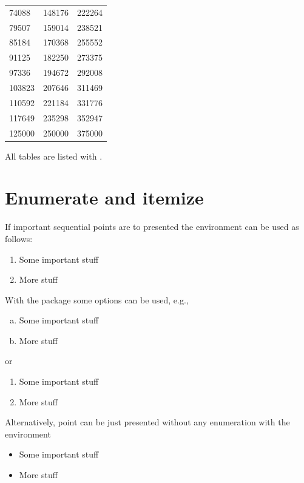 \begin{center}
\begin{longtable}{l|l|l}
 74088 & 148176 & 222264 \\
 79507 & 159014 & 238521 \\
 85184 & 170368 & 255552 \\
 91125 & 182250 & 273375 \\
 97336 & 194672 & 292008 \\
 103823 & 207646 & 311469 \\
 110592 & 221184 & 331776 \\
 117649 & 235298 & 352947 \\
 125000 & 250000 & 375000 \\
\end{longtable}
\end{center}

All tables are listed with .


\section{Enumerate and itemize}

If important sequential points are to presented the environment  can be used as follows:
\begin{enumerate}
\item
	Some important stuff
\item
	More stuff
\end{enumerate}
With the package  some options can be used, e.g.,
\begin{enumerate}[a)]
\item
	Some important stuff
\item
	More stuff
\end{enumerate}
or 
\begin{enumerate}[~~~1)]
\item
	Some important stuff
\item
	More stuff
\end{enumerate}

Alternatively, point can be just presented without any enumeration with the environment 
\begin{itemize}
\item
	Some important stuff
\item
	More stuff
\end{itemize}